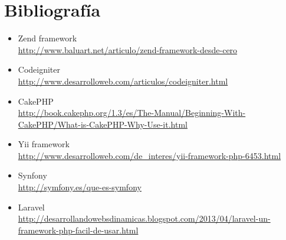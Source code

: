\section{Bibliografía}



\begin{itemize}

\item Zend framework\\
\url{http://www.baluart.net/articulo/zend-framework-desde-cero}

\item Codeigniter\\
\url{http://www.desarrolloweb.com/articulos/codeigniter.html}

\item CakePHP \\
\url{http://book.cakephp.org/1.3/es/The-Manual/Beginning-With-CakePHP/What-is-CakePHP-Why-Use-it.html}

\item Yii framework \\
\url{http://www.desarrolloweb.com/de_interes/yii-framework-php-6453.html}

\item Synfony \\
\url{http://symfony.es/que-es-symfony}

\item Laravel \\
\url{http://desarrollandowebsdinamicas.blogspot.com/2013/04/laravel-un-framework-php-facil-de-usar.html}

\end{itemize}

